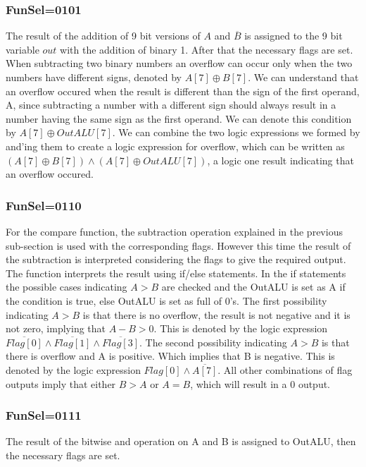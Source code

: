 \documentclass[pdftex,12pt,a4paper]{article}
\begin{document}
\subsubsection{FunSel=0101}
The result of the addition of 9 bit versions of $A$ and $\overline{B}$ is assigned to the 9 bit variable $out$ with the addition of
binary 1. After that the necessary flags are set.
\newline
When subtracting two binary numbers an overflow can occur only when the two numbers have different signs, denoted by $A[7]\oplus {B[7]}$.
We can understand that an overflow occured when the result is different than the sign of the first operand, A, since subtracting 
a number with a different sign should always result in a number having the same sign as the first operand. We can denote this 
condition by $A[7]\oplus {OutALU[7]}$. We can combine the two logic expressions we formed by and'ing them to create a logic expression 
for overflow, which can be written as $(A[7]\oplus {B[7]})\land(A[7]\oplus {OutALU[7]})$, a logic one result indicating that an 
overflow occured. 
\subsubsection{FunSel=0110}
For the compare function, the subtraction operation explained in the previous sub-section is used with the corresponding flags.
However this time the result of the subtraction is interpreted considering the flags to give the required output.
The function interprets the result using if/else statements. In the if statements the possible cases indicating $A>B$ are checked
and the OutALU is set as A if the condition is true, else OutALU is set as full of 0's.
\newline
The first possibility indicating $A>B$ is that there is no overflow, the result is not negative and it is not zero, implying that
$A-B>0$. This is denoted by the logic expression $\overline{Flag[0]}\land\overline{Flag[1]}\land\overline{Flag[3]}$.
\newline
The second possibility indicating $A>B$ is that there is overflow and A is positive. Which implies that B is negative. 
This is denoted by the logic expression $Flag[0]\land\overline{A[7]}$.
\newline
All other combinations of flag outputs imply that either $B>A$ or $A=B$, which will result in a 0 output.
\subsubsection{FunSel=0111}
The result of the bitwise and operation on A and B is assigned to OutALU, then the necessary flags are set. 
\end{document}
